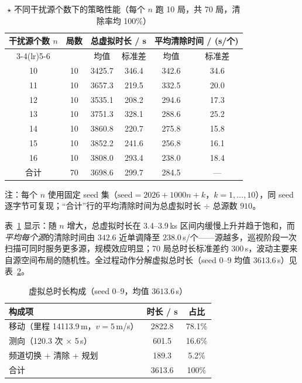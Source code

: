 \documentclass[UTF8, zihao=5,AutoFakeBold=2]{ctexart}
\begin{document}
\begin{table}[H]
    \centering
    \caption{$\star$ 不同干扰源个数下的策略性能（每个 \(n\) 跑 10 局，共 70 局，清除率均 100\%）}
    \label{tab:t3-sweep}
    \begin{tabular}{cccccc}
        \toprule
        \multirow{2}{*}{干扰源个数 \(n\)} & \multirow{2}{*}{局数} &
            \multicolumn{2}{c}{总虚拟时长 / s} &
            \multicolumn{2}{c}{平均清除时间 / (s/个)} \\
        \cmidrule(lr){3-4}\cmidrule(lr){5-6}
            & & 均值 & 标准差 & 均值 & 标准差 \\
        \midrule
        10 & 10 & 3425.7 & 346.4 & 342.6 & 34.6 \\
        11 & 10 & 3657.3 & 219.5 & 332.5 & 20.0 \\
        12 & 10 & 3535.1 & 208.2 & 294.6 & 17.3 \\
        13 & 10 & 3751.3 & 328.1 & 288.6 & 25.2 \\
        14 & 10 & 3860.8 & 220.7 & 275.8 & 15.8 \\
        15 & 10 & 3852.2 & 241.6 & 256.8 & 16.1 \\
        16 & 10 & 3808.0 & 293.4 & 238.0 & 18.4 \\
        \midrule
        合计 & 70 & 3698.6 & 299.7 & 284.5 & --- \\
        \bottomrule
    \end{tabular}
    \par\smallskip
    \footnotesize{注：每个 \(n\) 使用固定 seed 集（\(\text{seed}=2026+1000n+k\)，\(k=1,\dots,10\)），同 seed 逐字节可复现；“合计”行的平均清除时间为总虚拟时长 \(\div\) 总源数 \(910\)。}
\end{table}

表~\ref{tab:t3-sweep} 显示：随 \(n\) 增大，总虚拟时长在 3.4--3.9\,ks 区间内缓慢上升并趋于饱和，而\emph{平均每个源}的清除时间由 \(342.6\) 近单调降至 \(238.0\)\,s/个——源越多，巡视阶段一次扫描可同时服务更多源，规模效应明显；70 局总时长标准差约 \(300\)\,s，波动主要来自源空间布局的随机性。全过程动作分解虚拟总时长（seed 0--9 均值 \(3613.6\)\,s）见表~\ref{tab:t3-break}。

\begin{table}[H]
    \centering
    \caption{虚拟总时长构成（seed 0--9，均值 \(3613.6\)\,s）}
    \label{tab:t3-break}
    \begin{tabular}{lcc}
        \toprule
        构成项 & 时长 / s & 占比 \\
        \midrule
        移动（里程 14113.9\,m，\(v=5\)\,m/s） & 2822.8 & 78.1\% \\
        测向（120.3 次 \(\times\) 5\,s） & 601.5 & 16.6\% \\
        频道切换 + 清除 + 规划 & 189.3 & 5.2\% \\
        \midrule
        合计 & 3613.6 & 100\% \\
        \bottomrule
    \end{tabular}
\end{table}
\end{document}
